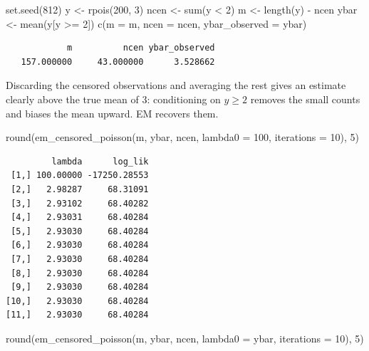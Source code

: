 \documentclass[
  letterpaper,
  DIV=11,
  numbers=noendperiod]{scrreprt}
\newenvironment{Shaded}{\begin{snugshade}}{\end{snugshade}}
\newcommand{\AttributeTok}[1]{\textcolor[rgb]{0.40,0.45,0.13}{#1}}
\newcommand{\DecValTok}[1]{\textcolor[rgb]{0.68,0.00,0.00}{#1}}
\newcommand{\FunctionTok}[1]{\textcolor[rgb]{0.28,0.35,0.67}{#1}}
\newcommand{\NormalTok}[1]{\textcolor[rgb]{0.00,0.23,0.31}{#1}}
\newcommand{\OtherTok}[1]{\textcolor[rgb]{0.00,0.23,0.31}{#1}}
\newcommand{\SpecialCharTok}[1]{\textcolor[rgb]{0.37,0.37,0.37}{#1}}
\begin{document}
\begin{Shaded}
\begin{Highlighting}[]
\FunctionTok{set.seed}\NormalTok{(}\DecValTok{812}\NormalTok{)}
\NormalTok{y    }\OtherTok{\textless{}{-}} \FunctionTok{rpois}\NormalTok{(}\DecValTok{200}\NormalTok{, }\DecValTok{3}\NormalTok{)}
\NormalTok{ncen }\OtherTok{\textless{}{-}} \FunctionTok{sum}\NormalTok{(y }\SpecialCharTok{\textless{}} \DecValTok{2}\NormalTok{)}
\NormalTok{m    }\OtherTok{\textless{}{-}} \FunctionTok{length}\NormalTok{(y) }\SpecialCharTok{{-}}\NormalTok{ ncen}
\NormalTok{ybar }\OtherTok{\textless{}{-}} \FunctionTok{mean}\NormalTok{(y[y }\SpecialCharTok{\textgreater{}=} \DecValTok{2}\NormalTok{])}
\FunctionTok{c}\NormalTok{(}\AttributeTok{m =}\NormalTok{ m, }\AttributeTok{ncen =}\NormalTok{ ncen, }\AttributeTok{ybar\_observed =}\NormalTok{ ybar)}
\end{Highlighting}
\end{Shaded}

\begin{verbatim}
            m          ncen ybar_observed 
   157.000000     43.000000      3.528662 
\end{verbatim}

Discarding the censored observations and averaging the rest gives an
estimate clearly above the true mean of \(3\): conditioning on
\(y \ge 2\) removes the small counts and biases the mean upward. EM
recovers them.

\begin{Shaded}
\begin{Highlighting}[]
\FunctionTok{round}\NormalTok{(}\FunctionTok{em\_censored\_poisson}\NormalTok{(m, ybar, ncen, }\AttributeTok{lambda0 =} \DecValTok{100}\NormalTok{, }\AttributeTok{iterations =} \DecValTok{10}\NormalTok{), }\DecValTok{5}\NormalTok{)}
\end{Highlighting}
\end{Shaded}

\begin{verbatim}
         lambda      log_lik
 [1,] 100.00000 -17250.28553
 [2,]   2.98287     68.31091
 [3,]   2.93102     68.40282
 [4,]   2.93031     68.40284
 [5,]   2.93030     68.40284
 [6,]   2.93030     68.40284
 [7,]   2.93030     68.40284
 [8,]   2.93030     68.40284
 [9,]   2.93030     68.40284
[10,]   2.93030     68.40284
[11,]   2.93030     68.40284
\end{verbatim}

\begin{Shaded}
\begin{Highlighting}[]
\FunctionTok{round}\NormalTok{(}\FunctionTok{em\_censored\_poisson}\NormalTok{(m, ybar, ncen, }\AttributeTok{lambda0 =}\NormalTok{ ybar, }\AttributeTok{iterations =} \DecValTok{10}\NormalTok{), }\DecValTok{5}\NormalTok{)}
\end{Highlighting}
\end{Shaded}
\end{document}
